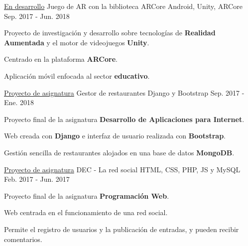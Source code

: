 

\begin{cventries}

  \cventry
    {\href{https://github.com/matl1995/TFG}{En desarrollo}} %
    {Juego de AR con la biblioteca ARCore} %
    {Android, Unity, ARCore} %
    {Sep. 2017 - Jun. 2018} %
    {
      \begin{cvitems} %
        \item {Proyecto de investigación y desarrollo sobre tecnologías de \textbf{Realidad Aumentada} y el motor de videojuegos \textbf{Unity}.}
        \item {Centrado en la plataforma \textbf{ARCore}.}
        \item {Aplicación móvil enfocada al sector \textbf{educativo}.}
      \end{cvitems}
    }

  \cventry
    {\href{https://github.com/matl1995/DAI}{Proyecto de asignatura}} %
    {Gestor de restaurantes} %
    {Django y Bootstrap} %
    {Sep. 2017 - Ene. 2018} %
    {
      \begin{cvitems} %
        \item {Proyecto final de la asignatura \textbf{Desarrollo de Aplicaciones para Internet}.}
        \item {Web creada con \textbf{Django} e interfaz de usuario realizada con \textbf{Bootstrap}.}
        \item {Gestión sencilla de restaurantes alojados en una base de datos \textbf{MongoDB}.}
      \end{cvitems}
    }

  \cventry
    {\href{https://github.com/matl1995/PW}{Proyecto de asignatura}} %
    {DEC - La red social} %
    {HTML, CSS, PHP, JS y MySQL} %
    {Feb. 2017 - Jun. 2017} %
    {
      \begin{cvitems} %
        \item {Proyecto final de la asignatura \textbf{Programación Web}.}
        \item {Web centrada en el funcionamiento de una red social.}
        \item {Permite el registro de usuarios y la publicación de entradas, y pueden recibir comentarios.}
      \end{cvitems}
    }


\end{cventries}
